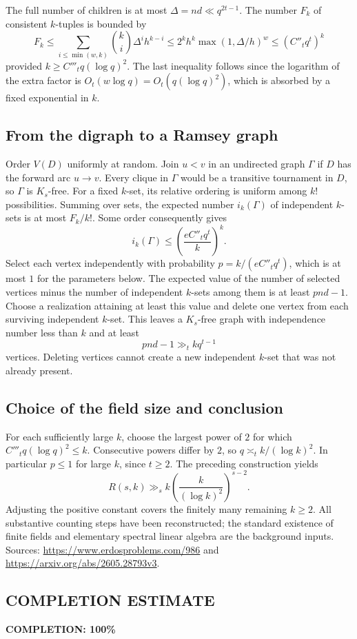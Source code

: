 The full number of children is at most $\Delta=nd\ll q^{2t-1}$. The number $F_k$ of consistent $k$-tuples is bounded by
\[
 F_k\le\sum_{i\le\min(w,k)}\binom{k}{i}\Delta^ih^{k-i}
 \le2^kh^k\max(1,\Delta/h)^w
 \le(C''_tq^t)^k
 \tag{2}
\]
provided $k\ge C'''_tq(\log q)^2$. The last inequality follows since the logarithm of the extra factor is $O_t(w\log q)=O_t(q(\log q)^2)$, which is absorbed by a fixed exponential in $k$.

\subsection*{From the digraph to a Ramsey graph}
Order $V(D)$ uniformly at random. Join $u<v$ in an undirected graph $\Gamma$ if $D$ has the forward arc $u\to v$.
Every clique in $\Gamma$ would be a transitive tournament in $D$, so $\Gamma$ is $K_s$-free.
For a fixed $k$-set, its relative ordering is uniform among $k!$ possibilities.
Summing over sets, the expected number $i_k(\Gamma)$ of independent $k$-sets is at most $F_k/k!$.
Some order consequently gives
\[
 i_k(\Gamma)\le\left(\frac{eC''_tq^t}{k}\right)^k.
\]
Select each vertex independently with probability
$p=k/(eC''_tq^t)$, which is at most $1$ for the parameters below.
The expected value of the number of selected vertices minus the number of independent $k$-sets among them is at least $pnd-1$.
Choose a realization attaining at least this value and delete one vertex from each surviving independent $k$-set. This leaves a $K_s$-free graph with independence number less than $k$ and at least
\[
 pnd-1\gg_t kq^{t-1}
\]
vertices. Deleting vertices cannot create a new independent $k$-set that was not already present.

\subsection*{Choice of the field size and conclusion}
For each sufficiently large $k$, choose the largest power of $2$ for which
$C'''_tq(\log q)^2\le k$. Consecutive powers differ by $2$, so
$q\asymp_t k/(\log k)^2$. In particular $p\le1$ for large $k$, since $t\ge2$.
The preceding construction yields
\[
 R(s,k)\gg_s k\left(\frac{k}{(\log k)^2}\right)^{s-2}.
\]
Adjusting the positive constant covers the finitely many remaining $k\ge2$.
All substantive counting steps have been reconstructed; the standard existence of finite fields and elementary spectral linear algebra are the background inputs. Sources:
\url{https://www.erdosproblems.com/986} and \url{https://arxiv.org/abs/2605.28793v3}.
\subsection*{COMPLETION ESTIMATE}
\textbf{COMPLETION: 100\%}
